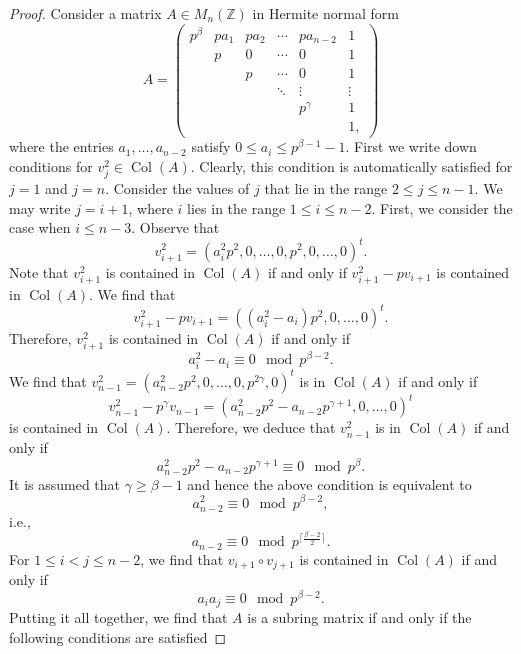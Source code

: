 \documentclass[a4paper]{amsart}
\numberwithin{equation}{section}
\theoremstyle{remark}
\newcommand{\Z}{\mathbb{Z}}
\newcommand{\op}[1]{\operatorname{#1}}
\begin{document}
 \begin{proof}
 Consider a matrix $A\in M_n(\Z)$ in Hermite normal form 
  \[A=\begin{pmatrix}
	 p^{\beta}& p a_1 & pa_2 & \cdots & pa_{n-2}& 1 \\
	& p & 0 & \cdots & 0 & 1\\
	&& p & \cdots & 0 & 1\\
	&&& \ddots & \vdots& \vdots\\
	&&&& p^{\gamma} & 1\\
	&&&&& 1,
	\end{pmatrix}\] where the entries $a_1,\dots, a_{n-2}$ satisfy $0\leq a_i \leq p^{\beta-1}-1$.
	First we write down conditions for $v_j^2\in \op{Col}(A)$. Clearly, this condition is automatically satisfied for $j=1$ and $j=n$. Consider the values of $j$ that lie in the range $2\leq j\leq n-1$. We may write $j=i+1$, where $i$ lies in the range $1\leq i \leq n-2$. First, we consider the case when $i\leq n-3$. Observe that 
	\[v_{i+1}^2=(a_i^2p^2, 0, \dots, 0, p^2, 0, \dots, 0)^t.\]Note that $v_{i+1}^2$ is contained in $\op{Col}(A)$ if and only if $v_{i+1}^2-p v_{i+1}$ is contained in $\op{Col}(A)$. We find that 
	\[v_{i+1}^2-p v_{i+1}=\left((a_i^2-a_i)p^2,0, \dots,0 \right)^t.\] Therefore, $v_{i+1}^2$ is contained in $\op{Col}(A)$ if and only if 
	\begin{equation}
	   a_i^2-a_i\equiv 0\mod{p^{\beta-2}}.
	\end{equation}
	We find that $v_{n-1}^2=(a_{n-2}^2 p^2, 0, \dots, 0, p^{2\gamma}, 0)^t$ is in $\op{Col}(A)$ if and only if 
	\[v_{n-1}^2-p^\gamma v_{n-1}=\left( a_{n-2}^2p^2-a_{n-2}p^{\gamma+1}, 0,\dots, 0\right)^t\] is contained in $\op{Col}(A)$. Therefore, we deduce that $v_{n-1}^2$ is in $\op{Col}(A)$ if and only if
	\begin{equation}
	    a_{n-2}^2p^2-a_{n-2}p^{\gamma+1}\equiv 0 \mod{p^{\beta}}.
	\end{equation}
	It is assumed that $\gamma \geq \beta-1$ and hence the above condition is equivalent to 
	\[a_{n-2}^2\equiv 0\mod{p^{\beta-2}},\]
	i.e., 
	\begin{equation}
	    a_{n-2}\equiv 0 \mod{p^{\lceil \frac{\beta-2}{2} \rceil}}.
	\end{equation}
	For $1\leq i<j\leq n-2$, we find that $v_{i+1}\circ v_{j+1}$ is contained in $\op{Col}(A)$ if and only if 
	\begin{equation}
	    a_i a_j\equiv 0\mod{p^{\beta-2}}.
	\end{equation}
	Putting it all together, we find that $A$ is a subring matrix if and only if the following conditions are satisfied

\end{proof}
\end{document}
